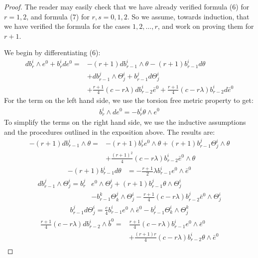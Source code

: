 \documentclass[11pt]{amsart}
\theoremstyle{definition}
\begin{document}
\begin{proof}  The reader may easily check that we have already verified formula (6) for $r=1,2$, and formula (7) for $r,s = 0,1,2$.  So we assume, towards induction, that we have verified the formula for the cases $1,2,\ldots,r$, and work on proving them for $r+1$.  

We begin by differentiating (6):
%
\begin{align*}
d b^i_r \wedge e^0 + b^i_r d e^0 = &-(r+1) d b^i_{r-1} \wedge \theta - (r+1) b^i_{r-1} d \theta \\
&+ d b^j_{r-1} \wedge \Theta^i_j + b^j_{r-1} d \Theta^i_j \\
&+ \frac{r+1}{4} (c - r \lambda) d b^i_{r-2} \bar{e}^0 + \frac{r+1}{4} (c - r \lambda) b^i_{r - 2} d \bar{e}^0
\end{align*} 
%
For the term on the left hand side, we use the torsion free metric property to get:
%
\begin{align*}
b^i_r \wedge d e^0 = - b^i_r \theta \wedge e^0
\end{align*}
%
To simplify the terms on the right hand side, we use the inductive assumptions and the procedures outlined in the exposition above.  The results are:
%
\begin{align*}
-(r+1) d b^i_{r-1} \wedge \theta = &-(r+1) b^i_r e^0 \wedge \theta + (r+1) b^j_{r-1} \Theta^i_j \wedge \theta  \\
&+ \frac{(r+1)^2}{4} (c - r \lambda) b^i_{r-2} \bar{e}^0 \wedge \theta 
\end{align*}
%
\begin{align*}
- (r+1) b^i_{r-1} d \theta &= - \frac{r+1}{2} \lambda b^i_{r-1} e^0 \wedge \bar{e}^0
\end{align*}
%
\begin{align*}
d b^j_{r-1} \wedge \Theta^i_j = b^j_{r} &e^0 \wedge \Theta^i_j + (r+1) b^j_{r-1} \theta \wedge \Theta^i_j \\
&- b^k_{r-1} \Theta^j_k \wedge \Theta^i_j - \frac{r+1}{4}(c - r \lambda) b^j_{r-2} \bar{e}^0 \wedge \Theta^i_j
\end{align*}
%
\begin{align*}
b^j_{r-1} d \Theta^i_j = \frac{c}{4} b^i_{r-1} e^0 \wedge \bar{e}^0 - b^j_{r-1} \Theta^i_k \wedge \Theta^k_j
\end{align*}
%
\begin{align*}
\frac{r+1}{4}(c-r \lambda) d b^i_{r-2} \wedge \bar{b}^0 = &\frac{r+1}{4} (c - r \lambda) b^i_{r-1} e^0 \wedge \bar{e}^0 \\
&+ \frac{ (r+1)r }{4}( c - r \lambda) b^i_{r-2} \theta \wedge \bar{e}^0 \\

\end{align*}
\end{proof}
\end{document}
